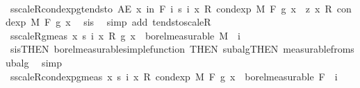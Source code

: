 \begin{isabellebody}
\ \ \ \ \ \ \isamarkupfalse%
\ s{\isacharunderscore}{\kern0pt}scaleR{\isacharunderscore}{\kern0pt}cond{\isacharunderscore}{\kern0pt}exp{\isacharunderscore}{\kern0pt}g{\isacharunderscore}{\kern0pt}tendsto{\isacharcolon}{\kern0pt}\ {\isachardoublequoteopen}AE\ x\ in\ {\isacharquery}{\kern0pt}F{\isachardot}{\kern0pt}\ {\isacharparenleft}{\kern0pt}{\isasymlambda}i{\isachardot}{\kern0pt}\ s\ i\ x\ {\isacharasterisk}{\kern0pt}\isactrlsub R\ cond{\isacharunderscore}{\kern0pt}exp\ M\ F\ g\ x{\isacharparenright}{\kern0pt}\ {\isasymlonglonglongrightarrow}\ z\ x\ {\isacharasterisk}{\kern0pt}\isactrlsub R\ cond{\isacharunderscore}{\kern0pt}exp\ M\ F\ g\ x{\isachardoublequoteclose}\ \isamarkupfalse%
\ s{\isacharunderscore}{\kern0pt}is{\isacharparenleft}{\kern0pt}{}{\isacharparenright}{\kern0pt}\ \isamarkupfalse%
\ {\isacharparenleft}{\kern0pt}simp\ add{\isacharcolon}{\kern0pt}\ tendsto{\isacharunderscore}{\kern0pt}scaleR{\isacharparenright}{\kern0pt}\isanewline
\isanewline
\ \ \ \ \ \ \isamarkupfalse%
\ s{\isacharunderscore}{\kern0pt}scaleR{\isacharunderscore}{\kern0pt}g{\isacharunderscore}{\kern0pt}meas{\isacharcolon}{\kern0pt}\ {\isachardoublequoteopen}{\isacharparenleft}{\kern0pt}{\isasymlambda}x{\isachardot}{\kern0pt}\ s\ i\ x\ {\isacharasterisk}{\kern0pt}\isactrlsub R\ g\ x{\isacharparenright}{\kern0pt}\ {\isasymin}\ borel{\isacharunderscore}{\kern0pt}measurable\ M{\isachardoublequoteclose}\ \ i\ \isamarkupfalse%
\ s{\isacharunderscore}{\kern0pt}is{\isacharparenleft}{\kern0pt}{}{\isacharparenright}{\kern0pt}{\isacharbrackleft}{\kern0pt}THEN\ borel{\isacharunderscore}{\kern0pt}measurable{\isacharunderscore}{\kern0pt}simple{\isacharunderscore}{\kern0pt}function{\isacharcomma}{\kern0pt}\ THEN\ subalg{\isacharprime}{\kern0pt}{\isacharbrackleft}{\kern0pt}THEN\ measurable{\isacharunderscore}{\kern0pt}from{\isacharunderscore}{\kern0pt}subalg{\isacharbrackright}{\kern0pt}{\isacharbrackright}{\kern0pt}\ \isamarkupfalse%
\ simp\isanewline
\ \ \ \ \ \ \isamarkupfalse%
\ s{\isacharunderscore}{\kern0pt}scaleR{\isacharunderscore}{\kern0pt}cond{\isacharunderscore}{\kern0pt}exp{\isacharunderscore}{\kern0pt}g{\isacharunderscore}{\kern0pt}meas{\isacharcolon}{\kern0pt}\ {\isachardoublequoteopen}{\isacharparenleft}{\kern0pt}{\isasymlambda}x{\isachardot}{\kern0pt}\ s\ i\ x\ {\isacharasterisk}{\kern0pt}\isactrlsub R\ cond{\isacharunderscore}{\kern0pt}exp\ M\ F\ g\ x{\isacharparenright}{\kern0pt}\ {\isasymin}\ borel{\isacharunderscore}{\kern0pt}measurable\ {\isacharquery}{\kern0pt}F{\isachardoublequoteclose}\ \ i\ \isamarkupfalse%

\end{isabellebody}
